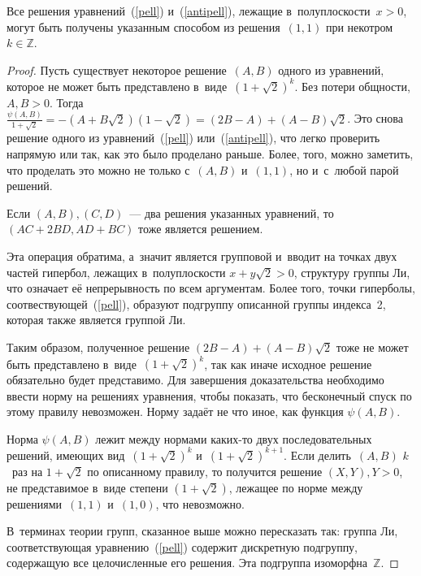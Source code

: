 \documentclass{article}
\begin{document}
\begin{theorem}
  Все решения уравнений~(\ref{pell}) и~(\ref{antipell}), лежащие
  в~полуплоскости~$x > 0$, могут быть получены указанным способом из
  решения~$(1, 1)$ при некотром $k \in \mathbb{Z}$.
\end{theorem}
\begin{proof}
  Пусть существует некоторое решение~$(A, B)$ одного из уравнений, которое не
  может быть представлено в~виде~$(1 + \sqrt{2})^k$. Без потери общности,
  $A, B > 0$. Тогда~$\frac{\psi(A, B)}{1 + \sqrt{2}} = -(A + B \sqrt{2})(1 -
  \sqrt{2}) = (2B - A) + (A - B) \sqrt{2}$. Это снова решение одного из
  уравнений~(\ref{pell}) или~(\ref{antipell}), что легко проверить напрямую
  или так, как это было проделано раньше. Более, того, можно заметить, что
  проделать это можно не только с~$(A, B)$ и~$(1, 1)$, но и~с~любой парой
  решений.
  \begin{exercise}
    Если $(A, B), (C, D)$~--- два решения указанных уравнений, то $(AC + 2BD,
    AD + BC)$ тоже является решением.
  \end{exercise}

  Эта операция обратима, а~значит является групповой и~вводит на
  точках двух частей гипербол, лежащих в~полуплоскости $x + y\sqrt{2} > 0$,
  структуру группы Ли, что означает её непрерывность по всем аргументам. Более
  того, точки гиперболы, соотвествующей~(\ref{pell}), образуют подгруппу
  описанной группы индекса~2, которая также является группой Ли.

  Таким образом, полученное решение $(2B - A) + (A - B)\sqrt{2}$ тоже не может
  быть представлено в~виде~$(1 + \sqrt{2})^k$, так как иначе исходное решение
  обязательно будет представимо. Для завершения доказательства необходимо ввести
  норму на решениях уравнения, чтобы показать, что бесконечный спуск по этому
  правилу невозможен. Норму задаёт не что иное, как функция $\psi(A, B)$.

  Норма $\psi(A, B)$ лежит между нормами каких-то двух последовательных
  решений, имеющих вид~$(1 + \sqrt{2})^k$ и~$(1 + \sqrt{2})^{k+1}$. Если
  делить~$(A, B)$ $k$~раз на $1 + \sqrt{2}$ по описанному правилу, то получится
  решение $(X, Y), Y > 0$, не представимое в~виде степени $(1 + \sqrt{2})$,
  лежащее по норме между решениями~$(1, 1)$ и~$(1, 0)$, что невозможно.

  В~терминах теории групп, сказанное выше можно пересказать так: группа Ли,
  соответствующая уравнению~(\ref{pell}) содержит дискретную подгруппу,
  содержащую все целочисленные его решения. Эта подгруппа
  изоморфна~$\mathbb{Z}$.
\end{proof}
\end{document}
